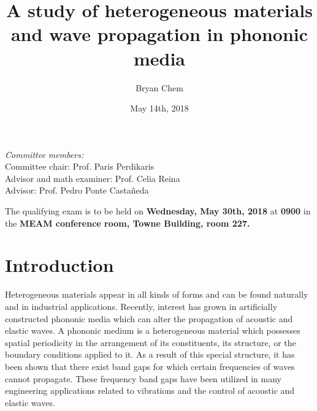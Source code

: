 \documentclass{article}
\title{A study of heterogeneous materials and wave propagation in phononic
media}
\author{Bryan Chem}
\date{May 14th, 2018}
\begin{document}

\maketitle
\vspace{3in}
\begin{center}
	\large\emph{Committee members:} \\
	Committee chair: Prof. Paris Perdikaris \\
	Advisor and math examiner: Prof. Celia Reina \\
	Advisor: Prof. Pedro Ponte Casta\~neda\\
\end{center}
\vspace{1in}
The qualifying exam is to be held on \textbf{Wednesday, May 30th, 2018} at 
\textbf{0900} in the \textbf{MEAM conference room, Towne Building, room 227.}

\newpage


\tableofcontents
\newpage


\section{Introduction}
Heterogeneous materials appear in all kinds of forms and can be found naturally 
and in industrial applications. Recently, interest has grown in artificially
constructed phononic media which can alter the propagation of acoustic and
elastic waves. A phononic medium is a heterogeneous material which possesses
spatial periodicity in the arrangement of its constituents, its structure,
or the boundary conditions applied to it. As a result of this special 
structure, it has been shown that there exist band gaps for which certain 
frequencies of waves cannot propagate. These frequency band gaps have been 
utilized in many engineering applications related to vibrations and the control 
of acoustic and elastic waves.
\end{document}
